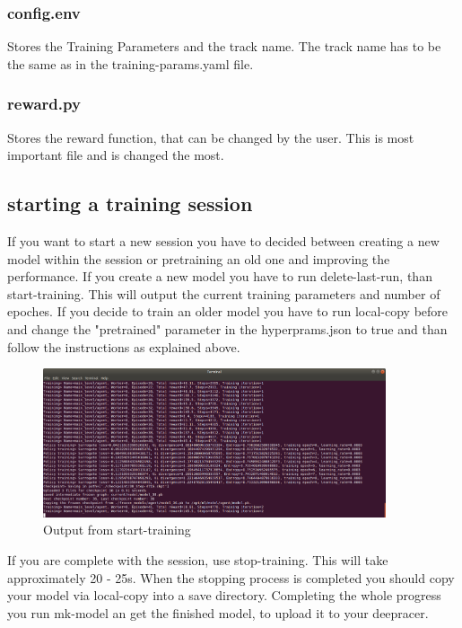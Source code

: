\subsubsection{config.env}
Stores the Training Parameters and the track name. The track name has to be the same as in the training-params.yaml file.

\subsubsection{reward.py}
Stores the reward function, that can be changed by the user. This is most important file and is changed the most.

\subsection{starting a training session}
If you want to start a new session you have to decided between creating a new model within the session or pretraining an old one and improving the performance. 
\newline If you create a new model you have to run delete-last-run, than start-training. This will output the current training parameters and number of epoches.
\newline If you decide to train an older model you have to run local-copy before and change the "pretrained" parameter in the hyperprams.json to true and than follow the instructions as explained above.

\begin{figure}[H]
    \centering
    \includegraphics[width=0.9\textwidth]{images/deepracer_local_session1_1_console.png}
    \caption[]{Output from start-training\footnotemark}
    \label{fig:console-output-start}
\end{figure}

If you are complete with the session, use stop-training. This will take approximately 20 - 25s. When the stopping process is completed you should copy your model via local-copy into a save directory. Completing the whole progress you run mk-model an get the finished model, to upload it to your deepracer.


